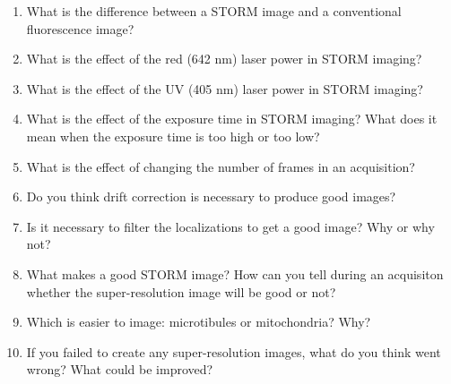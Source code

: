 \documentclass[10pt,a4paper,oneside]{book}
\begin{document}
\begin{enumerate}
    \item{What is the difference between a STORM image and a conventional fluorescence image?}
    \item{What is the effect of the red (642 nm) laser power in STORM imaging?}
    \item{What is the effect of the UV (405 nm) laser power in STORM imaging?}
    \item{What is the effect of the exposure time in STORM imaging? What does it mean when the exposure time is too high or too low?}
    \item{What is the effect of changing the number of frames in an acquisition?}
    \item{Do you think drift correction is necessary to produce good images?}
    \item{Is it necessary to filter the localizations to get a good image? Why or why not?}
    \item{What makes a good STORM image? How can you tell during an acquisiton whether the super-resolution image will be good or not?}
    \item{Which is easier to image: microtibules or mitochondria? Why?}
    \item{If you failed to create any super-resolution images, what do you think went wrong? What could be improved?}
\end{enumerate}
\end{document}

